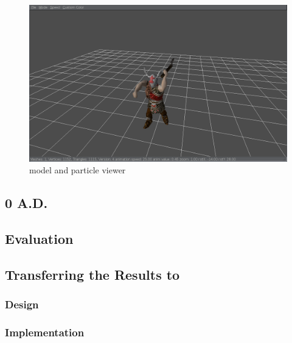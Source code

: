 \begin{figure}[h!]
    \centering
    \includegraphics[width=\textwidth]{pics/glestmodelviewer}
    \caption{\GLEST{} model and particle viewer}
    \label{fig:glestmodelviewer}
\end{figure}

\subsection{0 A.D.}

\subsection{Evaluation}

\subsection{Transferring the Results to \UH{}}
\subsubsection{Design}
\subsubsection{Implementation}
